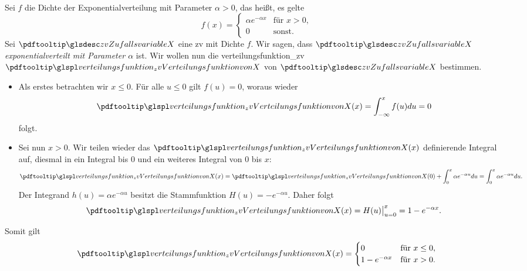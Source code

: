 \begin{bsp}
      \\
    Sei $f$ die Dichte der Exponentialverteilung mit Parameter $\alpha > 0$, das heißt, es gelte
    \[
        f(x) =
        \begin{cases}
            \alpha e^{-\alpha x} & \text{für } x > 0 ,\\
            0                      & \text{sonst.}
        \end{cases}
    \]
    Sei $\zvx$ eine \gls{zv} mit Dichte $f$.
    Wir sagen, dass $\zvx$ \emph{exponentialverteilt mit
    Parameter $\alpha$} ist.
    Wir wollen nun die \gls{verteilungsfunktion_zv} $\fxx$ von $\zvx$ bestimmen.
    \begin{itemize}
        \item Als erstes betrachten wir $x \leq 0$.
        Für alle $u \leq 0$ gilt $f(u) = 0$,
        woraus wieder
        \[
            \fxx(x) = \int_{-\infty}^{x} f(u) du = 0
        \]
        folgt.
        \item Sei nun $x > 0$.
        Wir teilen wieder das $\fxx(x)$ definierende Integral auf, diesmal in
        ein Integral bis $0$ und ein weiteres Integral von $0$ bis $x$:
        \[
            \fxx(x) = \fxx(0) + \int_{0}^{x} \alpha e^{-\alpha u} du
            = \int_{0}^{x} \alpha e^{-\alpha u} du.
        \]
        Der Integrand $h(u) = \alpha e^{-\alpha u}$ besitzt die Stammfunktion
        $H(u) = -e^{-\alpha u}$.
        Daher folgt
        \[
            \fxx(x) = H(u)\big|_{u=0}^{x} = 1 - e^{-\alpha x}.
        \]
    \end{itemize}
    Somit gilt
    \[
        \fxx(x) =
        \begin{cases}
            0                      & \text{für } x \leq 0 ,\\
            1 - e^{-\alpha x}    & \text{für } x > 0.
        \end{cases}
    \]
\end{bsp}

